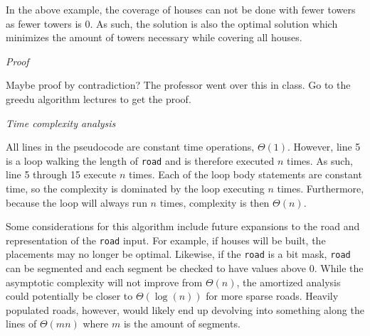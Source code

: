 \documentclass{article}
\begin{document}
In the above example, the coverage of houses can not be done with fewer towers
as fewer towers is 0. As such, the solution is also the optimal solution which 
minimizes the amount of towers necessary while covering all houses. 

\textit{Proof}

Maybe proof by contradiction? The professor went over this in class. Go to the
greedu algorithm lectures to get the proof. 

\textit{Time complexity analysis}

All lines in the pseudocode are constant time operations, $\Theta(1)$. However, 
line 5 is a loop walking the length of \texttt{road} and is therefore executed
$n$ times. As such, line 5 through 15 execute $n$ times. Each of the loop body 
statements are constant time, so the complexity is dominated by the loop
executing $n$ times. Furthermore, because the loop will always run $n$ times, 
complexity is then $\Theta(n)$. 

Some considerations for this algorithm include future expansions to the road and
representation of the \texttt{road} input. For example, if houses will be built,
the placements may no longer be optimal. Likewise, if the \texttt{road} is a bit
mask, \texttt{road} can be segmented and each segment be checked to have values
above 0. While the asymptotic complexity will not improve from $\Theta(n)$, the
amortized analysis could potentially be closer to $\Theta(\log(n))$ for more 
sparse roads. Heavily populated roads, however, would likely end up devolving 
into something along the lines of $\Theta(mn)$ where $m$ is the amount of
segments. 



\newpage
\end{document}
